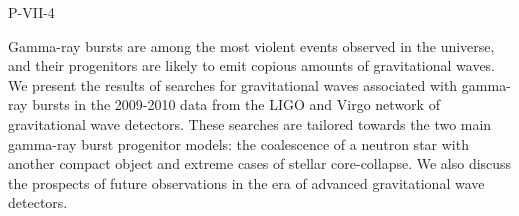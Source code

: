 P-VII-4


\bigskip



\bigskip

\noindent Gamma-ray bursts are among the most violent events observed in the
universe, and their progenitors are likely to emit copious amounts of
gravitational waves. We present the results of searches for
gravitational waves associated with gamma-ray bursts in the 2009-2010
data from the LIGO and Virgo network of gravitational wave
detectors. These searches are tailored towards the two
main gamma-ray burst progenitor models: the coalescence of a neutron
star with another compact object and extreme cases of stellar
core-collapse. We also discuss the prospects of future observations in
the era of advanced gravitational wave detectors.
